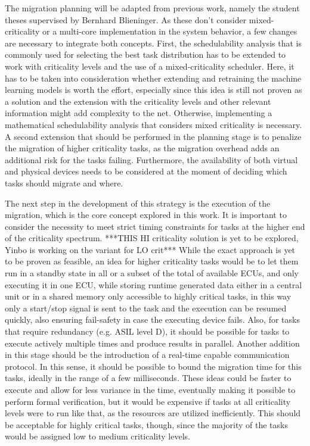 The migration planning will be adapted from previous work, namely the student theses supervised by Bernhard Blieninger. As these don't consider mixed-criticality or a multi-core implementation in the system behavior, a few changes are necessary to integrate both concepts. First, the schedulability analysis that is commonly used for selecting the best task distribution has to be extended to work with criticality levels and the use of a mixed-criticality scheduler. Here, it has to be taken into consideration whether extending and retraining the machine learning models is worth the effort, especially since this idea is still not proven as a solution and the extension with the criticality levels and other relevant information might add complexity to the net. Otherwise, implementing a mathematical schedulability analysis that considers mixed criticality is necessary. A second extension that should be performed in the planning stage is to penalize the migration of higher criticality tasks, as the migration overhead adds an additional risk for the tasks failing. Furthermore, the availability of both virtual and physical devices needs to be considered at the moment of deciding which tasks should migrate and where.

The next step in the development of this strategy is the execution of the migration, which is the core concept explored in this work. It is important to consider the necessity to meet strict timing constraints for tasks at the higher end of the criticality spectrum. ***THIS HI criticality solution is yet to be explored, Yinbo is working on the variant for LO crit*** While the exact approach is yet to be proven as feasible, an idea for higher criticality tasks would be to let them run in a standby state in all or a subset of the total of available ECUs, and only executing it in one ECU, while storing runtime generated data either in a central unit or in a shared memory only accessible to highly critical tasks, in this way only a start/stop signal is sent to the task and the execution can be resumed quickly, also ensuring fail-safety in case the executing device fails. Also, for tasks that require redundancy (e.g. ASIL level D), it should be possible for tasks to execute actively multiple times and produce results in parallel. Another addition in this stage should be the introduction of a real-time capable communication protocol. In this sense, it should be possible to bound the migration time for this tasks, ideally in the range of a few milliseconds. These ideas could be faster to execute and allow for less variance in the time, eventually making it possible to perform formal verification, but it would be expensive if tasks at all criticality levels were to run like that, as the resources are utilized inefficiently. This should be acceptable for highly critical tasks, though, since the majority of the tasks would be assigned low to medium criticality levels.

